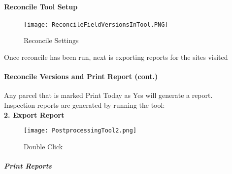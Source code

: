  \clearpage


 \paragraph{Reconcile Tool Setup}


 \vspace{.5in}





 \vspace{.5in}


 \begin{figure}[h!]
 \centering
     \texttt{[image: ReconcileFieldVersionsInTool.PNG]}
 \caption{Reconcile Settings}

\end{figure}



\noindent Once reconcile has been run, next is exporting reports for the sites visited

 \clearpage


 \paragraph*{Reconcile Versions and Print Report {\footnotesize (cont.)}}

 \vspace{.5in}

Any parcel that is marked Print Today as Yes will generate a report.\\ 
 
\noindent Inspection reports are generated by running the tool:\\
 

 \textbf{2. Export Report}

 \vspace{1in}

 \begin{wrapfigure}{r}{0.6\textwidth}

 \centering
     \texttt{[image: PostprocessingTool2.png]}
 \caption{Double Click}
 \end{wrapfigure}
 \subparagraph{Print Reports}
 \vspace{2in}


 \clearpage


